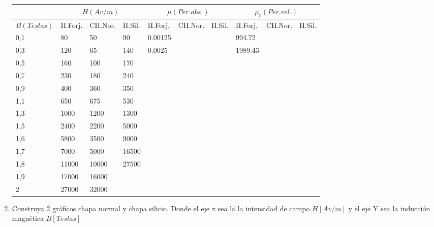 \documentclass[../main]{subfiles}
\begin{document}
\begin{enumerate}
   
    \begin{table}[ht]
\begin{center}
\footnotesize	
\begin{tabular}[c]{|l|l|l|l|p{1cm}|p{1cm}|p{1cm}|p{1cm}|p{1cm}|p{1cm}|}
 \hline
  & \multicolumn{3}{|c|}{$H(Av/m)$} &\multicolumn{3}{|c|}{$\mu (Per.abs.)$} &\multicolumn{3}{|c|}{$\mu_r (Per.rel.)$}  \\
 \hline
 {$B(Teslas)$} &H.Forj.& CH.Nor. & H.Sil.&H.Forj.& CH.Nor. & H.Sil.&H.Forj.& CH.Nor. & H.Sil.  \\
 \hline
 0,1 & 80 & 50 & 90 &0.00125 & & &994.72 & & \\ \hline
 0,3 & 120 & 65&140 &0.0025 & & &1989.43 & &\\\hline
 0,5&160&100&170& & & & & &\\\hline
 0,7&230&180&240& & & & & &\\\hline
 0,9&400&360&350& & & & & &\\\hline
 1,1&650&675&530& & & & & &\\\hline
 1,3&1000&1200&1300& & & & & &\\\hline
 1,5&2400&2200&5000& & & & & &\\\hline
 1,6&5800&3500&9000& & & & & &\\\hline
 1,7&7000&5000&16500& & & & & &\\\hline
 1,8&11000&10000&27500& & & & & &\\\hline
 1,9&17000&16000& & & & & & &\\\hline
 2&27000&32000& & & & & & &\\ \hline
\end{tabular}
\end{center}
\end{table}
\newpage
    \item Construya 2 gráficos chapa normal y chapa silicio. Donde el eje x sea la la intensidad de campo $H[Av/m]$ y el eje Y sea la inducción magnética $B[Teslas]$

\end{enumerate}
\end{document}
